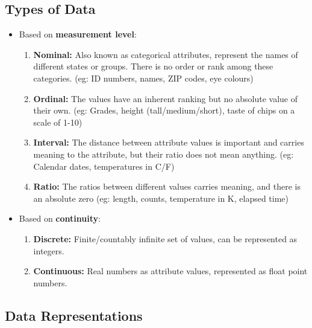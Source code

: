 \documentclass{article}
\theoremstyle{plain}
\theoremstyle{definition}
\begin{document}
\subsection{Types of Data}
\begin{itemize}
    \item Based on \textbf{measurement level}:
    \begin{enumerate}
        \item \textbf{Nominal:} Also known as categorical attributes, represent the names of different states or groups. There is no order or rank among these categories. (eg: ID numbers, names, ZIP codes, eye colours)
            
        \item \textbf{Ordinal:} The values have an inherent ranking but no absolute value of their own. (eg: Grades, height (tall/medium/short), taste of chips on a scale of 1-10)
            
        \item \textbf{Interval:} The distance between attribute values is important and carries meaning to the attribute, but their ratio does not mean anything. (eg: Calendar dates, 
            temperatures in C/F) 
            
        \item \textbf{Ratio:} The ratios between different values carries meaning, and there is an absolute zero (eg: length, counts, temperature in K, elapsed time)
    \end{enumerate}
    
    \item Based on \textbf{continuity}:
    \begin{enumerate}
        \item \textbf{Discrete:} Finite/countably infinite set of values, can be represented as integers.
        
        \item \textbf{Continuous:} Real numbers as attribute values, represented as float point numbers.
    \end{enumerate}
\end{itemize}

\subsection{Data Representations}
\end{document}
